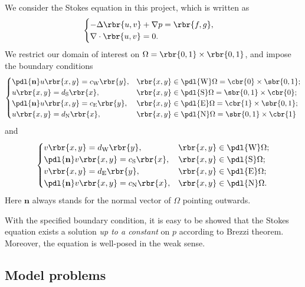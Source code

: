 \documentclass[english, nochinese]{pnote}
\begin{document}
We consider the Stokes equation in this project, which is written as
\begin{equation}
\begin{cases}
-\Delta \rbr{ u, v } + \nabla p = \rbr{ f, g }, \\
\nabla \cdot \rbr{ u, v } = 0.
\end{cases}
\end{equation}
We restrict our domain of interest on $ \Omega = \rbr{ 0, 1 } \times \rbr{ 0, 1 } $, and impose the boundary conditions
\begin{equation}
\begin{cases}
\pdl{\mathbf{n}} u \rbr{ x, y } = c_{\text{W}} \rbr{y}, & \rbr{ x, y } \in \pdl{\text{W}} \Omega = \cbr{0} \times \sbr{ 0, 1 }; \\
u \rbr{ x, y } = d_{\text{S}} \rbr{x}, & \rbr{ x, y } \in \pdl{\text{S}} \Omega = \sbr{ 0, 1 } \times \cbr{0}; \\
\pdl{\mathbf{n}} u \rbr{ x, y } = c_{\text{E}} \rbr{y}, & \rbr{ x, y } \in \pdl{\text{E}} \Omega = \cbr{1} \times \sbr{ 0, 1 }; \\
u \rbr{ x, y } = d_{\text{N}} \rbr{x}, & \rbr{ x, y } \in \pdl{\text{N}} \Omega = \sbr{ 0, 1 } \times \cbr{1}
\end{cases}
\end{equation}
and
\begin{equation}
\begin{cases}
v \rbr{ x, y } = d_{\text{W}} \rbr{y}, & \rbr{ x, y } \in \pdl{\text{W}} \Omega; \\
\pdl{\mathbf{n}} v \rbr{ x, y } = c_{\text{S}} \rbr{x}, & \rbr{ x, y } \in \pdl{\text{S}} \Omega; \\
v \rbr{ x, y } = d_{\text{E}} \rbr{y}, & \rbr{ x, y } \in \pdl{\text{E}} \Omega; \\
\pdl{\mathbf{n}} v \rbr{ x, y } = c_{\text{N}} \rbr{x}, & \rbr{ x, y } \in \pdl{\text{N}} \Omega.
\end{cases}
\end{equation}
Here $\mathbf{n}$ always stands for the normal vector of $\Omega$ pointing outwards.

With the specified boundary condition, it is easy to be showed that the Stokes equation exists a solution \emph{up to a constant} on $p$ according to Brezzi theorem. Moreover, the equation is well-posed in the weak sense.

\subsection{Model problems}
\end{document}

